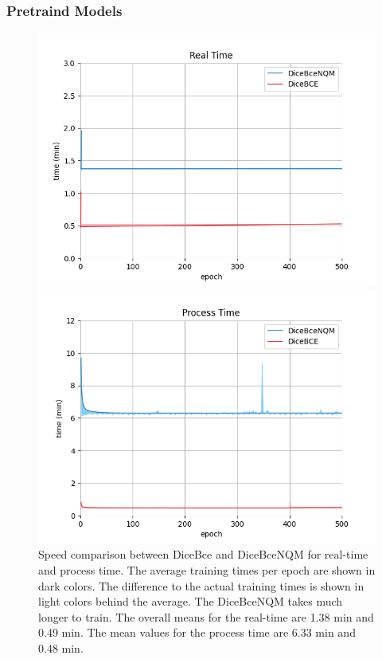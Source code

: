 \subsubsection{Pretraind Models}
\label{experiments:03.1.2:backbone_hippo:pretrained}
\begin{figure}[h!]
    \centering
        \begin{minipage}{0.49\textwidth}
        \centering
        \includegraphics[width=\linewidth]{Graphics/Experiments/3.1.2_realTime_with_error_.png}
    \end{minipage} \hfill
    \begin{minipage}{0.49\textwidth}
        \centering
        \includegraphics[width=\linewidth]{Graphics/Experiments/3.1.2_process_time_with_errors_.png}
    \end{minipage}
        \caption{Speed comparison between DiceBce and DiceBceNQM for real-time and process time. The average training times per epoch are shown in dark colors. The difference to the actual training times is shown in light colors behind the average. The DiceBceNQM takes much longer to train. The overall means for the real-time are 1.38 min and 0.49 min. The mean values for the process time are 6.33 min and 0.48 min.}
    \label{fig:DiceBCE+NQM:Pretrained:Speedcompare}
\end{figure}

